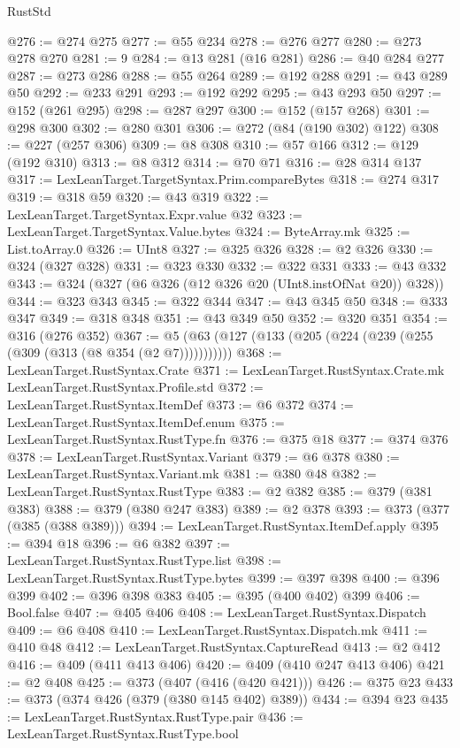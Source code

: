 \begin{lexlean}{RustStd}
\begin{coremodule}
{\begin{coremodule}
{{{{{{{{{{{{{{@276 := @274 @275
@277 := @55 @234
@278 := @276 @277
@280 := @273 @278 @270
@281 := 9
@284 := @13 @281 (@16 @281)
@286 := @40 @284 @277
@287 := @273 @286
@288 := @55 @264
@289 := @192 @288
@291 := @43 @289 @50
@292 := @233 @291
@293 := @192 @292
@295 := @43 @293 @50
@297 := @152 (@261 @295)
@298 := @287 @297
@300 := @152 (@157 @268)
@301 := @298 @300
@302 := @280 @301
@306 := @272 (@84 (@190 @302) @122)
@308 := @227 (@257 @306)
@309 := @8 @308
@310 := @57 @166
@312 := @129 (@192 @310)
@313 := @8 @312
@314 := @70 @71
@316 := @28 @314 @137
@317 := LexLeanTarget.TargetSyntax.Prim.compareBytes
@318 := @274 @317
@319 := @318 @59
@320 := @43 @319
@322 := LexLeanTarget.TargetSyntax.Expr.value @32
@323 := LexLeanTarget.TargetSyntax.Value.bytes
@324 := ByteArray.mk
@325 := List.toArray.{0}
@326 := UInt8
@327 := @325 @326
@328 := @2 @326
@330 := @324 (@327 @328)
@331 := @323 @330
@332 := @322 @331
@333 := @43 @332
@343 := @324 (@327 (@6 @326 (@12 @326 @20 (UInt8.instOfNat @20)) @328))
@344 := @323 @343
@345 := @322 @344
@347 := @43 @345 @50
@348 := @333 @347
@349 := @318 @348
@351 := @43 @349 @50
@352 := @320 @351
@354 := @316 (@276 @352)
@367 := @5 (@63 (@127 (@133 (@205 (@224 (@239 (@255 (@309 (@313 (@8 @354 (@2 @7)))))))))))
@368 := LexLeanTarget.RustSyntax.Crate
@371 := LexLeanTarget.RustSyntax.Crate.mk LexLeanTarget.RustSyntax.Profile.std
@372 := LexLeanTarget.RustSyntax.ItemDef
@373 := @6 @372
@374 := LexLeanTarget.RustSyntax.ItemDef.enum
@375 := LexLeanTarget.RustSyntax.RustType.fn
@376 := @375 @18
@377 := @374 @376
@378 := LexLeanTarget.RustSyntax.Variant
@379 := @6 @378
@380 := LexLeanTarget.RustSyntax.Variant.mk
@381 := @380 @48
@382 := LexLeanTarget.RustSyntax.RustType
@383 := @2 @382
@385 := @379 (@381 @383)
@388 := @379 (@380 @247 @383)
@389 := @2 @378
@393 := @373 (@377 (@385 (@388 @389)))
@394 := LexLeanTarget.RustSyntax.ItemDef.apply
@395 := @394 @18
@396 := @6 @382
@397 := LexLeanTarget.RustSyntax.RustType.list
@398 := LexLeanTarget.RustSyntax.RustType.bytes
@399 := @397 @398
@400 := @396 @399
@402 := @396 @398 @383
@405 := @395 (@400 @402) @399
@406 := Bool.false
@407 := @405 @406
@408 := LexLeanTarget.RustSyntax.Dispatch
@409 := @6 @408
@410 := LexLeanTarget.RustSyntax.Dispatch.mk
@411 := @410 @48
@412 := LexLeanTarget.RustSyntax.CaptureRead
@413 := @2 @412
@416 := @409 (@411 @413 @406)
@420 := @409 (@410 @247 @413 @406)
@421 := @2 @408
@425 := @373 (@407 (@416 (@420 @421)))
@426 := @375 @23
@433 := @373 (@374 @426 (@379 (@380 @145 @402) @389))
@434 := @394 @23
@435 := LexLeanTarget.RustSyntax.RustType.pair
@436 := LexLeanTarget.RustSyntax.RustType.bool
}}}}}}}}}}}}}}
\end{coremodule}}
\end{coremodule}
\end{lexlean}
